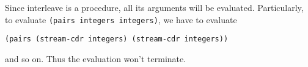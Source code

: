 \documentclass[a4paper,12pt]{article}
\begin{document}
Since interleave is a procedure, all its arguments will be evaluated.
Particularly, to evaluate \lstinline!(pairs integers integers)!, we
have to evaluate

\begin{lstlisting}
(pairs (stream-cdr integers) (stream-cdr integers))
\end{lstlisting}
and so on.  Thus the evaluation won't terminate.
\end{document}
